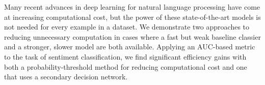 Many recent advances in deep learning for natural language processing have come at increasing computational cost, but the power of these state-of-the-art models is not needed for every example in a dataset. We demonstrate two approaches to reducing unnecessary computation in cases where a fast but weak baseline classier and a stronger, slower model are both available. Applying an AUC-based metric to the task of sentiment classification, we find significant efficiency gains with both a probability-threshold method for reducing computational cost and one that uses a secondary decision network.
